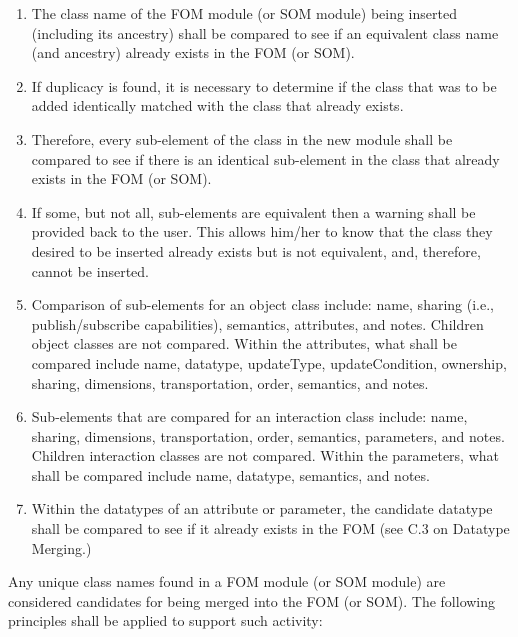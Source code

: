 \begin{enumerate}[leftmargin=52pt,labelsep=12pt,label=\arabic*),itemsep=0pt,topsep=-2pt,partopsep=0pt,parsep=0pt]
\item The class name of the FOM module (or SOM module) being inserted (including its ancestry) shall be compared to see if an equivalent class name (and ancestry) already exists in the FOM (or SOM).
\item If duplicacy is found, it is necessary to determine if the class that was to be added identically matched with the class that already exists.
\item Therefore, every sub-element of the class in the new module shall be compared to see if there is an identical sub-element in the class that already exists in the FOM (or SOM).
\item If some, but not all, sub-elements are equivalent then a warning shall be provided back to the user. This allows him/her to know that the class they desired to be inserted already exists but is not equivalent, and, therefore, cannot be inserted.
\item Comparison of sub-elements for an object class include: name, sharing (i.e., publish/subscribe capabilities), semantics, attributes, and notes. Children object classes are not compared. Within the attributes, what shall be compared include name, datatype, updateType, updateCondition, ownership, sharing, dimensions, transportation, order, semantics, and notes.
\item Sub-elements that are compared for an interaction class include: name, sharing, dimensions, transportation, order, semantics, parameters, and notes. Children interaction classes are not compared. Within the parameters, what shall be compared include name, datatype, semantics, and notes.
\item Within the datatypes of an attribute or parameter, the candidate datatype shall be compared to see if it already exists in the FOM (see C.3 on Datatype Merging.)
\end{enumerate}

Any unique class names found in a FOM module (or SOM module) are considered candidates for being merged into the FOM (or SOM). The following principles shall be applied to support such activity:


